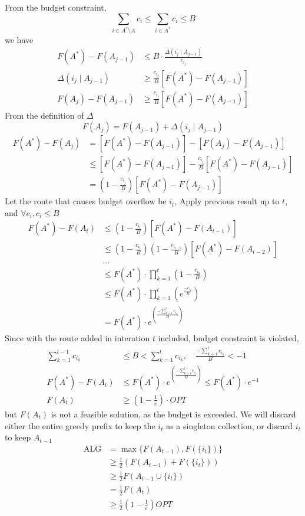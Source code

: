 \documentclass[10pt]{article}
\theoremstyle{definition}
\begin{document}
From the budget constraint, 
\[\sum_{i \in A^* \setminus A} c_i \leq \sum_{i \in A^*} c_i \leq B\]
we have 
\begin{align*}
F(A^*) - F(A_{j-1}) &\leq B \cdot \frac{\Delta(i_j \mid A_{j-1})}{c_{i_j}}  \\
\Delta(i_j \mid A_{j-1}) &\geq \frac{c_{i_j}}{B}[F(A^*) - F(A_{j-1})]\\
F(A_{j}) - F(A_{j-1}) &\geq \frac{c_{i_j}}{B}[F(A^*) - F(A_{j-1})]
\end{align*}
From the definition of $\Delta$
\[F(A_j) = F(A_{j-1}) + \Delta(i_j \mid A_{j-1})\]
\begin{align*}
  F(A^*) - F(A_j) &= \left[F(A^*) - F(A_{j-1})\right] - [F(A_j) - F(A_{j-1})]\\
  &\leq \left[F(A^*) - F(A_{j-1})\right] - \frac{c_{i_j}}{B}[F(A^*) - F(A_{j-1})]\\
  &= (1 - \frac{c_{i_j}}{B})[F(A^*) - F(A_{j-1})]
\end{align*}
Let the route that causes budget overflow be $i_t$, 
Apply previous result up to $t$, and $\forall c_i, c_i \leq B$
\begin{align*}
  F(A^*) - F(A_t) &\leq (1 - \frac{c_{i_t}}{B})[F(A^*) - F(A_{t-1})]\\
  &\leq \left(1 - \frac{c_{i_t}}{B}\right)\left(1 - \frac{c_{i_{t-1}}}{B}\right) [F(A^*) - F(A_{t-2})]\\
  &\dots \\
  &\leq F(A^*)\cdot \prod_{k = 1}^t \left(1 - \frac{c_{i_k}}{B}\right)\\
  &\leq F(A^*)\cdot \prod_{k = 1}^t (e^{\frac{-c_{i_k}}{B}})\\
  &= F(A^*)\cdot e^{\left( \frac{-\sum_{k=1}^{t} c_{i_k}}{B} \right)}
\end{align*}
Since with the route added in interation $t$ included, budget constraint is violated,
\begin{align*}
\sum_{k = 1}^{t-1} c_{i_k} &\leq B < \sum_{k = 1}^{t} c_{i_k}, \quad \frac{-\sum_{k=1}^{t} c_{i_k}}{B} < -1\\ 
F(A^*) - F(A_t) &\leq F(A^*)\cdot e^{\left( \frac{-\sum_{k=1}^{t} c_{i_k}}{B} \right)} \leq F(A^*) \cdot e^{-1}\\
F(A_t) &\geq \left(1 - \frac{1}{e}\right)\cdot OPT
\end{align*}
but $F(A_t)$ is not a feasible solution, as the budget is exceeded. We will discard either the entire greedy prefix 
to keep the $i_t$ as a singleton collection, or discard $i_t$ to keep $A_{t-1}$
\[
\begin{aligned}
\mathrm{ALG}
&= \max\{F(A_{t-1}),F(\{i_t\})\} \\
&\geq \frac{1}{2}\left(F(A_{t-1})+F(\{i_t\})\right)\\
&\geq \frac{1}{2} F(A_{t-1}\cup\{i_t\}) \\
&= \frac{1}{2} F(A_t) \\
&\geq \frac{1}{2}\left(1-\frac{1}{e}\right)OPT
\end{aligned}
\]
\end{document}
